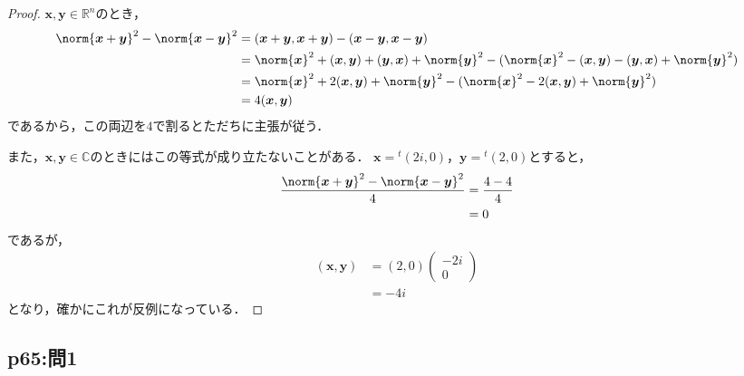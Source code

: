 \documentclass[uplatex,dvipdfmx,a4paper,10pt,fleqn]{jsarticle}
\begin{document}
\begin{tleftbar}
    \begin{proof}
        $\bm{x},\bm{y} \in \mathbb{R}^n$のとき，
        \begin{align*} 
            \norm{\bm{x}+\bm{y}}^2 - \norm{\bm{x}-\bm{y}}^2 & = (\bm{x}+\bm{y},\bm{x}+\bm{y}) - (\bm{x}-\bm{y},\bm{x}-\bm{y}) \\
            & = \norm{\bm{x}}^2 +(\bm{x},\bm{y})+(\bm{y},\bm{x})+ \norm{\bm{y}}^2 - (\norm{\bm{x}}^2 -(\bm{x},\bm{y})-(\bm{y},\bm{x})+\norm{\bm{y}}^2) \\
            & = \norm{\bm{x}}^2 + 2(\bm{x},\bm{y}) + \norm{\bm{y}}^2 - (\norm{\bm{x}}^2 - 2(\bm{x},\bm{y}) + \norm{\bm{y}}^2) \\
            & = 4(\bm{x},\bm{y})
        \end{align*}
        であるから，この両辺を$4$で割るとただちに主張が従う．
        
        また，$\bm{x},\bm{y} \in \mathbb{C}$のときにはこの等式が成り立たないことがある．
        $\bm{x}={}^t (2i,0)$，$\bm{y}={}^t (2,0)$とすると，
        \begin{align*}
        \frac{\norm{\bm{x}+\bm{y}}^2 - \norm{\bm{x}-\bm{y}}^2 }{4} &= \frac{4-4}{4} \\
        & =0
        \end{align*}
        であるが，
        \begin{align*}
        (\bm{x},\bm{y})& =(2,0) \begin{pmatrix} -2i  \\ 0 \end{pmatrix} \\
        &= -4i
        \end{align*}
        となり，確かにこれが反例になっている．
        \end{proof}
    \end{tleftbar}

    \newpage 

    \subsection*{p65:問1}
\end{document}
